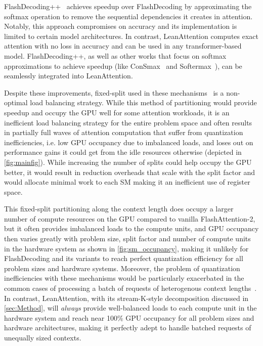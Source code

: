 FlashDecoding++~\cite{hong2024flashdecoding}  achieves speedup over FlashDecoding by approximating the softmax operation to remove the sequential dependencies it creates in attention. Notably, this approach compromises on accuracy and its implementation is limited to certain model architectures. In contrast, LeanAttention computes exact attention with no loss in accuracy and can be used in any transformer-based model. FlashDecoding++, as well as other works that focus on softmax approximations to achieve speedup (like ConSmax~\cite{53124} and Softermax~\cite{stevens2021softermax}), can be seamlessly integrated into LeanAttention.

Despite these improvements, fixed-split used in these mechanisms~\cite{flashdecoding, flashinfer, hong2024flashdecoding} is a non-optimal load balancing strategy. While this method of partitioning would provide speedup and occupy the GPU well for some attention workloads, it is an inefficient load balancing strategy for the entire problem space and often results in partially full waves of attention computation that suffer from quantization inefficiencies, i.e. low GPU occupancy due to imbalanced loads, and loses out on performance gains it could get from the idle resources otherwise (depicted in \autoref{fig:mainfig}). While increasing the number of splits could help occupy the GPU better, it would result in reduction overheads that scale with the split factor and would allocate minimal work to each SM making it an inefficient use of register space. 

This fixed-split partitioning along the context length does occupy a larger number of compute resources on the GPU compared to vanilla FlashAttention-2, but it often provides imbalanced loads to the compute units, and GPU occupancy then varies greatly with problem size, split factor and number of compute units in the hardware system as shown in \autoref{fig:sm_occupancy}, making it unlikely for FlashDecoding and its variants to reach perfect quantization efficiency for all problem sizes and hardware systems. Moreover, the problem of quantization inefficiencies with these mechanisms would be particularly exacerbated in the common cases of processing a batch of requests of heterogenous context lengths~\cite{sarathi}. In contrast, LeanAttention, with its stream-K-style decomposition discussed in \autoref{sec:Method}, will \textit{always} provide well-balanced loads to each compute unit in the hardware system and reach near 100\% GPU occupancy for all problem sizes and hardware architectures, making it perfectly adept to handle batched requests of unequally sized contexts. 

